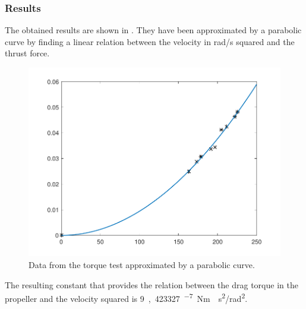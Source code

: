 \subsubsection{Results}
The obtained results are shown in . They have been approximated by a parabolic curve by finding a linear relation between the velocity in rad/s squared and the thrust force.

\begin{figure}[H]
	\centering
	\includegraphics[scale=0.8]{figures/TorqueGraph}
	\caption{Data from the torque test approximated by a parabolic curve.}
	\label{TorqueGraph}
\end{figure}

The resulting constant that provides the relation between the drag torque in the propeller and the velocity squared is \si{9,423327^{-7} Nm\cdot s^2/rad^2}.
